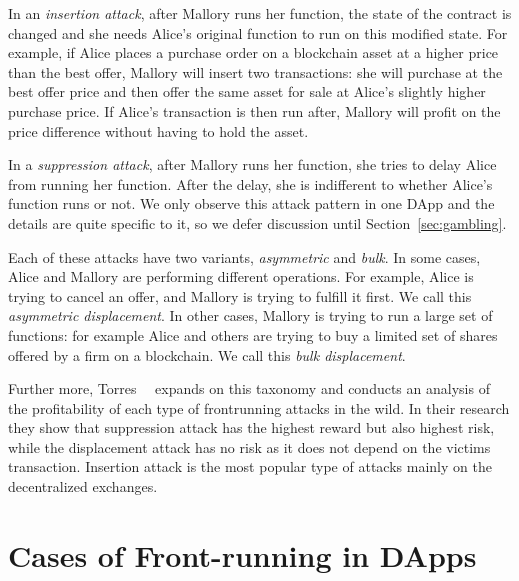 In an \textit{insertion attack}, after Mallory runs her function, the state of the contract is changed and she needs Alice's original function to run on this modified state. For example, if Alice places a purchase order on a blockchain asset at a higher price than the best offer, Mallory will insert two transactions: she will purchase at the best offer price and then offer the same asset for sale at Alice's slightly higher purchase price. If Alice's transaction is then run after, Mallory will profit on the price difference without having to hold the asset.

In a \textit{suppression attack}, after Mallory runs her function, she tries to delay Alice from running her function. After the delay, she is indifferent to whether Alice's function runs or not. We only observe this attack pattern in one DApp and the details are quite specific to it, so we defer discussion until Section~\ref{sec:gambling}.

Each of these attacks have two variants, \textit{asymmetric} and \textit{bulk}. In some cases, Alice and Mallory are performing different operations. For example, Alice is trying to cancel an offer, and Mallory is trying to fulfill it first. We call this \textit{asymmetric displacement}. In other cases, Mallory is trying to run a large set of functions: for example Alice and others are trying to buy a limited set of shares offered by a firm on a blockchain. We call this \textit{bulk displacement}. 

Further more, Torres~\etal~\cite{torres2021frontrunner} expands on this taxonomy and conducts an analysis of the profitability of each type of frontrunning attacks in the wild. In their research they show that suppression attack has the highest reward but also highest risk, while the displacement attack has no risk as it does not depend on the victims transaction. Insertion attack is the most popular type of attacks mainly on the decentralized exchanges.


\section{Cases of Front-running in DApps}



